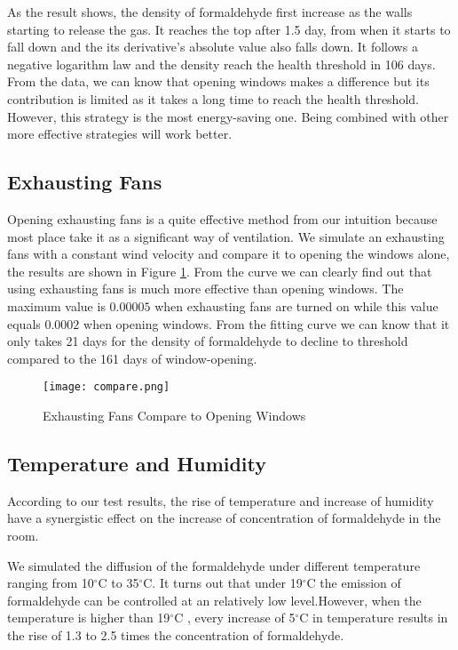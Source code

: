 \documentclass{mcmthesis}
\begin{document}
As the result shows, the density of formaldehyde first increase as the walls starting to release the gas. It reaches the top after 1.5 day, from when it starts to fall down and the its derivative's absolute value also falls down. It follows a negative logarithm law and the density reach the health threshold in 106 days. From the data, we can know that opening windows makes a difference but its contribution is limited as it takes a long time to reach the health threshold. However, this strategy is the most energy-saving one. Being combined with other more effective strategies will work better.

 
\subsection{Exhausting Fans}

Opening exhausting fans is a quite effective method from our intuition because most place take it as a significant way of ventilation. We simulate an exhausting fans with a constant wind velocity and compare it to opening the windows alone, the results are shown in Figure \ref{fig:compare}. From the curve we can clearly find out that using exhausting fans is much more effective than opening windows. The maximum value is $0.00005$ when exhausting fans are turned on while this value equals $0.0002$ when opening windows. From the fitting curve we can know that it only takes 21 days for the density of formaldehyde to decline to threshold compared to the 161 days of window-opening.

\begin{figure}[H]
  \centering
  \texttt{[image: compare.png]}
  \caption{Exhausting Fans Compare to Opening Windows}
  \label{fig:compare}
\end{figure}

\subsection{Temperature and Humidity}
According to our test results, the rise of temperature and increase of humidity have a synergistic effect on the increase of concentration of formaldehyde in the room. 

We simulated the diffusion of the formaldehyde under  different temperature ranging from 10$^{\circ}$C  to 35$^{\circ}$C. It turns out that under 19$^{\circ}$C the emission of formaldehyde can be controlled at an relatively low level.However, when the temperature is higher than 19$^{\circ}$C , every increase of 5$^{\circ}$C in temperature results in the rise of 1.3 to 2.5 times the concentration of formaldehyde.\cite{zhang2006temp}
\end{document}
